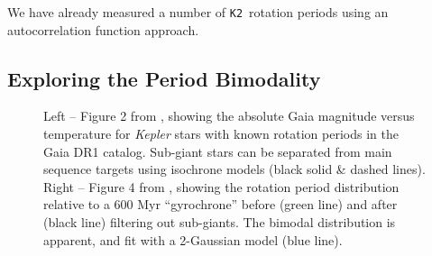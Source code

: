 \documentclass[12pt]{article}
\newcommand{\Kepler}{\textsl{Kepler}\xspace}
\newcommand{\ktwo}{{\tt K2}}
\begin{document}
We have already measured a number of \ktwo\ rotation periods using an
autocorrelation function approach.






\subsection{Exploring the Period Bimodality}

\begin{figure}[!th]
\centering
{}
\caption{Left -- Figure 2 from \citet{davenport2017}, showing the absolute Gaia magnitude versus temperature for \Kepler stars with known rotation periods in the Gaia DR1 catalog. Sub-giant stars can be separated from main sequence targets using isochrone models (black solid \& dashed lines). Right -- Figure 4 from \citet{davenport2017}, showing the rotation period distribution relative to a 600 Myr ``gyrochrone'' before (green line) and after (black line) filtering out sub-giants. The bimodal distribution is apparent, and fit with a 2-Gaussian model (blue line).}
\label{fig:cmd}
\end{figure}
\end{document}
